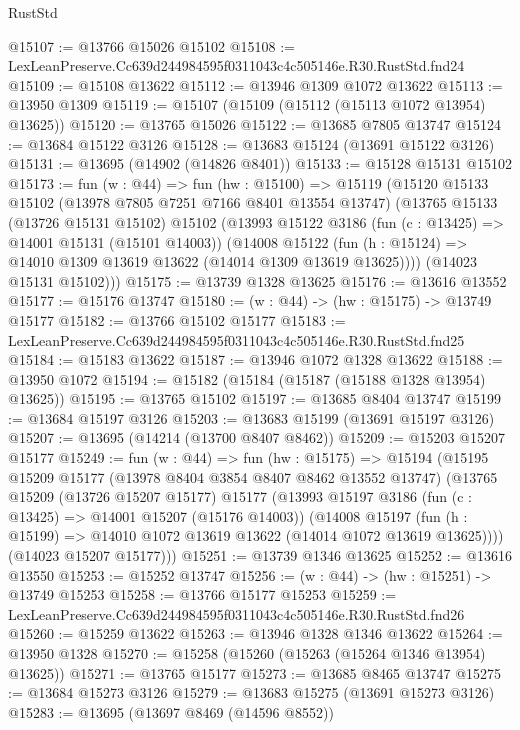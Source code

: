 \begin{lexlean}{RustStd}
\begin{coremodule}
@15107 := @13766 @15026 @15102
@15108 := LexLeanPreserve.Cc639d244984595f0311043c4c505146e.R30.RustStd.fnd24
@15109 := @15108 @13622
@15112 := @13946 @1309 @1072 @13622
@15113 := @13950 @1309
@15119 := @15107 (@15109 (@15112 (@15113 @1072 @13954) @13625))
@15120 := @13765 @15026
@15122 := @13685 @7805 @13747
@15124 := @13684 @15122 @3126
@15128 := @13683 @15124 (@13691 @15122 @3126)
@15131 := @13695 (@14902 (@14826 @8401))
@15133 := @15128 @15131 @15102
@15173 := fun (w : @44) =>
  fun (hw : @15100) =>
  @15119
    (@15120
      @15133
      @15102
      (@13978 @7805 @7251 @7166 @8401 @13554 @13747)
      (@13765
        @15133
        (@13726 @15131 @15102)
        @15102
        (@13993
          @15122
          @3186
          (fun (c : @13425) => @14001 @15131 (@15101 @14003))
          (@14008
            @15122
            (fun (h : @15124) => @14010 @1309 @13619 @13622 (@14014 @1309 @13619 @13625))))
        (@14023 @15131 @15102)))
@15175 := @13739 @1328 @13625
@15176 := @13616 @13552
@15177 := @15176 @13747
@15180 := (w : @44) -> (hw : @15175) -> @13749 @15177
@15182 := @13766 @15102 @15177
@15183 := LexLeanPreserve.Cc639d244984595f0311043c4c505146e.R30.RustStd.fnd25
@15184 := @15183 @13622
@15187 := @13946 @1072 @1328 @13622
@15188 := @13950 @1072
@15194 := @15182 (@15184 (@15187 (@15188 @1328 @13954) @13625))
@15195 := @13765 @15102
@15197 := @13685 @8404 @13747
@15199 := @13684 @15197 @3126
@15203 := @13683 @15199 (@13691 @15197 @3126)
@15207 := @13695 (@14214 (@13700 @8407 @8462))
@15209 := @15203 @15207 @15177
@15249 := fun (w : @44) =>
  fun (hw : @15175) =>
  @15194
    (@15195
      @15209
      @15177
      (@13978 @8404 @3854 @8407 @8462 @13552 @13747)
      (@13765
        @15209
        (@13726 @15207 @15177)
        @15177
        (@13993
          @15197
          @3186
          (fun (c : @13425) => @14001 @15207 (@15176 @14003))
          (@14008
            @15197
            (fun (h : @15199) => @14010 @1072 @13619 @13622 (@14014 @1072 @13619 @13625))))
        (@14023 @15207 @15177)))
@15251 := @13739 @1346 @13625
@15252 := @13616 @13550
@15253 := @15252 @13747
@15256 := (w : @44) -> (hw : @15251) -> @13749 @15253
@15258 := @13766 @15177 @15253
@15259 := LexLeanPreserve.Cc639d244984595f0311043c4c505146e.R30.RustStd.fnd26
@15260 := @15259 @13622
@15263 := @13946 @1328 @1346 @13622
@15264 := @13950 @1328
@15270 := @15258 (@15260 (@15263 (@15264 @1346 @13954) @13625))
@15271 := @13765 @15177
@15273 := @13685 @8465 @13747
@15275 := @13684 @15273 @3126
@15279 := @13683 @15275 (@13691 @15273 @3126)
@15283 := @13695 (@13697 @8469 (@14596 @8552))

\end{coremodule}
\end{lexlean}
